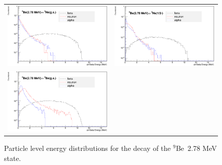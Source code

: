 \documentclass{JINST}
\newcommand{\beNINE}{$^{9}$Be~}
\begin{document}
    \begin{figure}[htp]
  \centering
      
  \begin{tabular}{cc}

    \includegraphics[width=70mm]{a_n_beta_spect_c4.eps}&

    \includegraphics[width=70mm]{a_n_beta_spect_c5.eps}\\

      \includegraphics[width=70mm]{a_n_beta_spect_c6.eps}&
      
      
  \end{tabular}
  \caption{Particle level energy distributions for the decay of the \beNINE 2.78 MeV state.}
    \end{figure}
\end{document}
